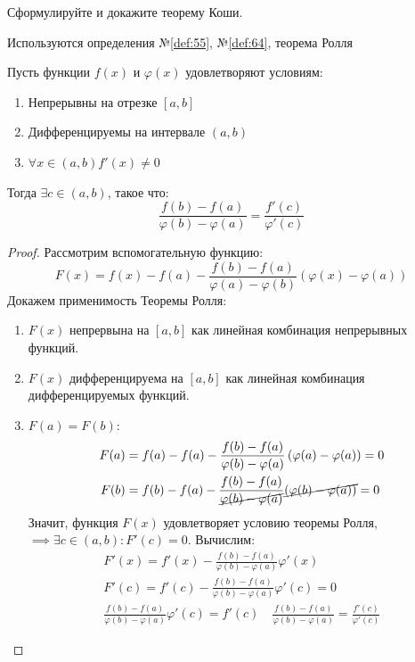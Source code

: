 \begin{question}
    Сформулируйте и докажите теорему Коши.
\end{question}
\begin{used}
    Используются определения №\ref{def:55}, №\ref{def:64}, теорема Ролля
\end{used}
\begin{theorem}
    Пусть функции $f(x)$ и  $\varphi(x)$ удовлетворяют условиям: 
  \begin{enumerate}
    \item Непрерывны на отрезке $[a, b]$
    \item Дифференцируемы на интервале  $(a, b)$ 
    \item  $\forall x \in (a, b) f'(x) \neq 0$
  \end{enumerate}
  Тогда $\exists  c \in (a, b)$, такое что: \[
    \boxed{\frac{f(b) - f(a)}{\varphi(b) - \varphi(a)} = \frac{f'(c)}{\varphi'(c)}}
  \] 
\end{theorem}
\begin{proof}
    Рассмотрим вспомогательную функцию: \[
        F(x) = f(x) - f(a) - \frac{f(b) - f(a)}{\varphi(a) - \varphi(b)}(\varphi(x) - \varphi(a))
    \]
    Докажем применимость Теоремы Ролля:
    \begin{enumerate}
        \item $F(x)$ непрервына на $[a, b]$ как линейная комбинация непрерывных функций.
        \item  $F(x)$ дифференцируема на $[a, b]$ как линейная комбинация дифференцируемых функций.
        \item  $F(a) = F(b)$:
        \begin{align*}
            F(a) &= f(a) - f(a) - \frac{f(b) - f(a)}{\varphi(b) - \varphi(a)}\left( \varphi(a) - \varphi(a) \right) = 0 \\ 
            F(b) &= f(b) - f(a) - \frac{f(b) - f(a)}{\cancel{\varphi(b) - \varphi(a)}}\cancel{\left( \varphi(b) - \varphi(a) \right)} = 0
        \end{align*}
        Значит, функция $F(x)$ удовлетворяет условию теоремы Ролля, $\implies \exists  c \in (a, b) : F'(c) = 0$. Вычислим:
        \begin{gather*}
            F'(x) = f'(x) - \frac{f(b) - f(a)}{\varphi(b) - \varphi(a)} \varphi'(x) \\ 
            F'(c) = f'(c) - \frac{f(b) - f(a)}{\varphi(b) - \varphi(a)} \varphi'(c) = 0 \\
            \frac{f(b) - f(a)}{\varphi(b) - \varphi(a)} \varphi'(c) = f'(c) \quad 
            \boxed{\frac{f(b) - f(a)}{\varphi(b) - \varphi(a)} = \frac{f'(c)}{\varphi'(c)}}
        \end{gather*}
    \end{enumerate}
\end{proof}
\pagebreak



